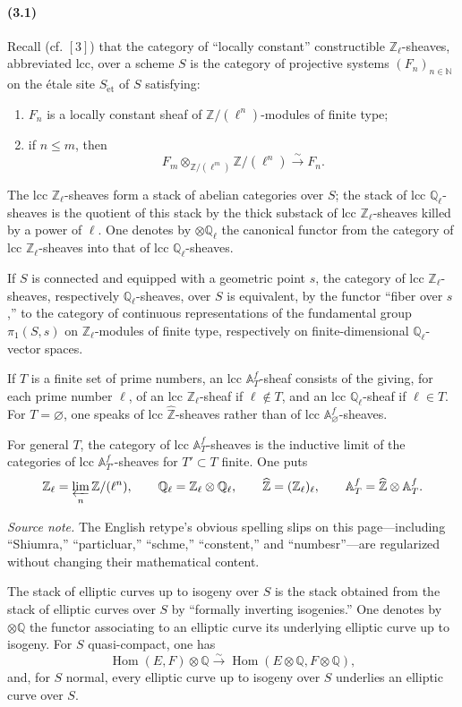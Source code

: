 \documentclass[10pt]{article}
\newcommand{\Q}{\mathbb Q}
\newcommand{\Z}{\mathbb Z}
\newcommand{\bZ}{\widehat{\mathbb Z}}
\newcommand{\Hom}{\operatorname{Hom}}
\newcommand{\et}{\mathrm{\acute et}}
\begin{document}
\paragraph{(3.1)}
Recall (cf. \([3]\)) that the category of ``locally constant'' constructible $\Z_\ell$-sheaves,
abbreviated lcc, over a scheme $S$ is the category of projective systems $(F_n)_{n\in\mathbb N}$
on the étale site $S_{\et}$ of $S$ satisfying:
\begin{enumerate}[label=(\roman*)]
\item $F_n$ is a locally constant sheaf of $\Z/(\ell^n)$-modules of finite type;
\item if $n\le m$, then
\[
F_m\otimes_{\Z/(\ell^m)}\Z/(\ell^n)\xrightarrow{\sim}F_n.
\]
\end{enumerate}
The lcc $\Z_\ell$-sheaves form a stack of abelian categories over $S$; the stack of lcc
$\Q_\ell$-sheaves is the quotient of this stack by the thick substack of lcc $\Z_\ell$-sheaves
killed by a power of $\ell$. One denotes by $\otimes\Q_\ell$ the canonical functor from the
category of lcc $\Z_\ell$-sheaves into that of lcc $\Q_\ell$-sheaves.

If $S$ is connected and equipped with a geometric point $s$, the category of lcc
$\Z_\ell$-sheaves, respectively $\Q_\ell$-sheaves, over $S$ is equivalent, by the functor
``fiber over $s$,'' to the category of continuous representations of the fundamental group
$\pi_1(S,s)$ on $\Z_\ell$-modules of finite type, respectively on finite-dimensional
$\Q_\ell$-vector spaces.

If $T$ is a finite set of prime numbers, an lcc $\mathbb A_T^f$-sheaf consists of the giving, for
each prime number $\ell$, of an lcc $\Z_\ell$-sheaf if $\ell\notin T$, and an lcc
$\Q_\ell$-sheaf if $\ell\in T$. For $T=\varnothing$, one speaks of lcc $\bZ$-sheaves rather
than of lcc $\mathbb A_\varnothing^f$-sheaves.

For general $T$, the category of lcc $\mathbb A_T^f$-sheaves is the inductive limit of the categories
of lcc $\mathbb A_{T'}^f$-sheaves for $T'\subset T$ finite. One puts
\[
\Z_\ell=\varprojlim_n \Z/(\ell^n),\qquad
\Q_\ell=\Z_\ell\otimes\Q_\ell,\qquad
\bZ=(\Z_\ell)_\ell,\qquad
\mathbb A_T^f=\bZ\otimes\mathbb A_T^f.
\]

\noindent\emph{Source note.} The English retype's obvious spelling slips on this page---including
``Shiumra,'' ``particluar,'' ``schme,'' ``constent,'' and ``numbesr''---are regularized without
changing their mathematical content.

The stack of elliptic curves up to isogeny over $S$ is the stack obtained from the stack
of elliptic curves over $S$ by ``formally inverting isogenies.'' One denotes by $\otimes\Q$ the
functor associating to an elliptic curve its underlying elliptic curve up to isogeny. For $S$
quasi-compact, one has
\[
\Hom(E,F)\otimes\Q\xrightarrow{\sim}\Hom(E\otimes\Q,F\otimes\Q),
\]
and, for $S$ normal, every elliptic curve up to isogeny over $S$ underlies an elliptic curve
over $S$.
\end{document}
